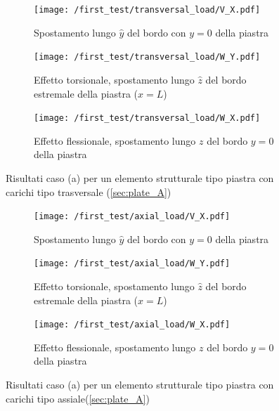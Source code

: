 \documentclass[a4paper,num-refs]{oup-contemporary}
\begin{document}
\begin{figure}[bt!]
	\centering
	
	\begin{subfigure}[t]{0.3\textwidth}
		\centering
		\texttt{[image: /first\_test/transversal\_load/V\_X.pdf]}
		\caption{Spostamento lungo $\hat y$ del bordo con $y=0$ della piastra}
		
	\end{subfigure}
	\hfill
	\begin{subfigure}[t]{0.3\textwidth}
		\centering
		\texttt{[image: /first\_test/transversal\_load/W\_Y.pdf]}
		
		\caption{Effetto torsionale, spostamento lungo $\hat z$ del bordo estremale della piastra ($x=L$)}
		
	\end{subfigure}
	\hfill
	\begin{subfigure}[t]{0.3\textwidth}
		\centering
		\texttt{[image: /first\_test/transversal\_load/W\_X.pdf]}
		\caption{Effetto flessionale, spostamento lungo $z$ del bordo $y=0$ della piastra}
		
	\end{subfigure}
	\hfill
	\caption{Risultati caso (a) per un elemento strutturale tipo piastra con carichi tipo trasversale (\cref{sec:plate_A})}
	\label{fig:plate_A_transload_load}
\end{figure}

\begin{figure}[bt!]
	\centering
	
	\begin{subfigure}[t]{0.3\textwidth}
		\centering
		\texttt{[image: /first\_test/axial\_load/V\_X.pdf]}
		\caption{Spostamento lungo $\hat y$ del bordo con $y=0$ della piastra}
		
	\end{subfigure}
	\hfill
	\begin{subfigure}[t]{0.3\textwidth}
		\centering
		\texttt{[image: /first\_test/axial\_load/W\_Y.pdf]}
		
		\caption{Effetto torsionale, spostamento lungo $\hat z$ del bordo estremale della piastra ($x=L$)}
		
	\end{subfigure}
	\hfill
	\begin{subfigure}[t]{0.3\textwidth}
		\centering
		\texttt{[image: /first\_test/axial\_load/W\_X.pdf]}
		\caption{Effetto flessionale, spostamento lungo $z$ del bordo $y=0$ della piastra}
		
	\end{subfigure}
	\hfill
	\caption{Risultati caso (a) per un elemento strutturale tipo piastra con carichi tipo assiale(\cref{sec:plate_A})}
	\label{fig:plate_A_axial_load}
\end{figure}
\end{document}
